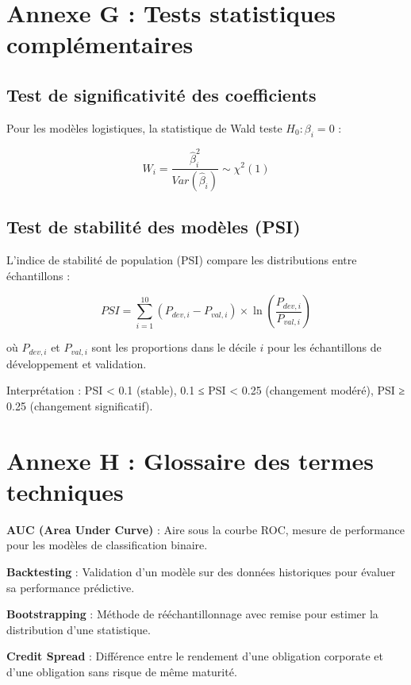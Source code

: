 \section{Annexe G : Tests statistiques complémentaires}

\subsection{Test de significativité des coefficients}

Pour les modèles logistiques, la statistique de Wald teste $H_0: \beta_i = 0$ :

\begin{equation}
W_i = \frac{\hat{\beta}_i^2}{Var(\hat{\beta}_i)} \sim \chi^2(1)
\end{equation}

\subsection{Test de stabilité des modèles (PSI)}

L'indice de stabilité de population (PSI) compare les distributions entre échantillons :

\begin{equation}
PSI = \sum_{i=1}^{10} (P_{dev,i} - P_{val,i}) \times \ln\left(\frac{P_{dev,i}}{P_{val,i}}\right)
\end{equation}

où $P_{dev,i}$ et $P_{val,i}$ sont les proportions dans le décile $i$ pour les échantillons de développement et validation.

Interprétation : PSI < 0.1 (stable), 0.1 ≤ PSI < 0.25 (changement modéré), PSI ≥ 0.25 (changement significatif).

\section{Annexe H : Glossaire des termes techniques}

\textbf{AUC (Area Under Curve)} : Aire sous la courbe ROC, mesure de performance pour les modèles de classification binaire.

\textbf{Backtesting} : Validation d'un modèle sur des données historiques pour évaluer sa performance prédictive.

\textbf{Bootstrapping} : Méthode de rééchantillonnage avec remise pour estimer la distribution d'une statistique.

\textbf{Credit Spread} : Différence entre le rendement d'une obligation corporate et d'une obligation sans risque de même maturité.

